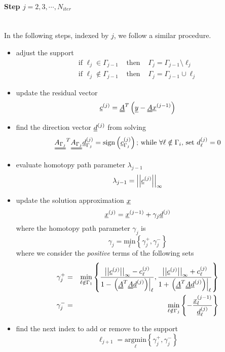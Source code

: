 \documentclass[11pt]{article} %
\begin{document}
\paragraph{Step $j = 2, 3, \cdots, N_{iter}$} \ \\
In the following steps, indexed by $j$, we follow a similar procedure.
\begin{itemize}
\item adjust the support
\begin{eqnarray}
\text{if } \ell_j \in \Gamma_{j-1} &\text{ then }& \Gamma_j = \Gamma_{j-1} \setminus \ell_j\\
\text{if } \ell_j \notin \Gamma_{j-1} & \text{ then }& \Gamma_j = \Gamma_{j-1} \cup \ell_j
\end{eqnarray}
\item update the residual vector
\begin{equation}
\uline{c}^{(j)} = \uuline{A}^T \left(\uline{y} - \uuline{A}\uline{x}^{(j-1)}\right)
\end{equation}
\item find the direction vector $\uline{d}^{(j)}$ from solving
\begin{equation}
\uuline{A_{\Gamma_j}}^T \uuline{A_{\Gamma_j}} \uline{d}_{\Gamma_j}^{(j)} = \mathrm{sign} \left(\uline{c}^{(j)}_{\Gamma_j}\right) \text{; while } \forall \ell \notin \Gamma_i \text{, set  } d_{\ell}^{(j)} = 0
\end{equation}
\item evaluate homotopy path parameter $\lambda_{j-1}$
\begin{equation}
\lambda_{j-1} = \left|\left| \uline{c}^{(j)}\right| \right|_{\infty}
\end{equation}
\item update the solution approximation $\uline{x}$
\begin{equation}
\uline{x}^{(j)} = \uline{x}^{(j-1)} + \gamma_j  \uline{d}^{(j)}
\end{equation}
where the homotopy path parameter $\gamma_j$ is
\begin{equation}
\gamma_j = \underset{\ell}{\mathrm{min}}\left\{ \gamma_j^+, \gamma_j^-\right\}
\end{equation}
where we consider the \textit{positive} terms of the following sets
\begin{eqnarray}
 \gamma_j^+ & = & \underset{\ell \notin \Gamma_1 }{\mathrm{min}}\left\{\frac{\left|\left| \uline{c}^{(j)}\right| \right|_{\infty} - c_{\ell}^{(j)}}{1-\left.\left(\uuline{A}^T \uuline{A} \uline{d}^{(j)}\right)\right|_{\ell}}, \frac{\left|\left| \uline{c}^{(j)}\right| \right|_{\infty} + c_{\ell}^{(j)}}{1 + \left.\left(\uuline{A}^T \uuline{A} \uline{d}^{(j)}\right)\right|_{\ell}}  \right\}\\
 \gamma_j^- & = & \underset{\ell \notin \Gamma_j }{\mathrm{min}}\left\{ -\frac{\uline{x}_l^{(j-1)}}{\uline{d}_{\ell}^{(j)}}  \right\}
\end{eqnarray}
\item find the next index to add or remove to the support
\begin{equation}
\ell_{j+1} = \underset{\ell}{\mathrm{argmin}}\left\{\gamma_j^+, \gamma_j^-\right\}
\end{equation}
\end{itemize}
\end{document}

